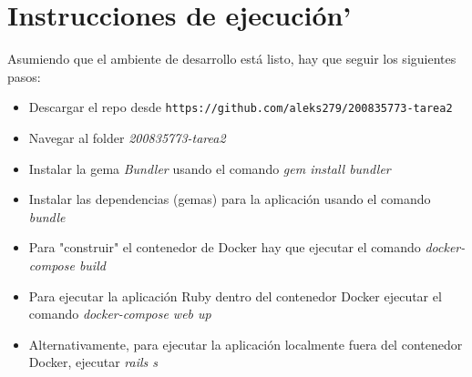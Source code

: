 \documentclass{article}
\begin{document}
\section{Instrucciones de ejecuci\'on'}
Asumiendo que el ambiente de desarrollo est\'a listo, hay que seguir los siguientes pasos:
\begin{itemize}
  \item Descargar el repo desde \texttt{https://github.com/aleks279/200835773-tarea2}
  \item Navegar al folder \emph{200835773-tarea2}
  \item Instalar la gema \emph{Bundler} usando el comando \emph{gem install bundler}
  \item Instalar las dependencias (gemas) para la aplicaci\'on usando el comando \emph{bundle}
  \item Para "construir" el contenedor de Docker hay que ejecutar el comando \emph{docker-compose build}
  \item Para ejecutar la aplicaci\'on Ruby dentro del contenedor Docker ejecutar el comando \emph{docker-compose web up}
  \item Alternativamente, para ejecutar la aplicaci\'on localmente fuera del contenedor Docker, ejecutar \emph{rails s}
\end{itemize}
\end{document}
